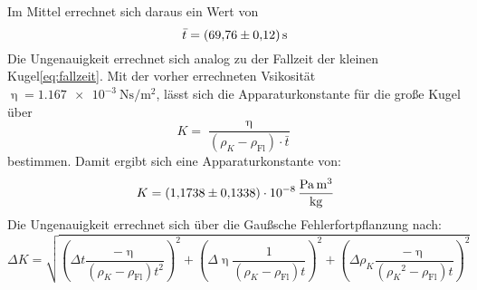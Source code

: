  Im Mittel errechnet sich daraus ein Wert von
 \begin{equation*}
   \bar{t} = \SI{69.76\pm0.12}{\second}
 \end{equation*}
 Die Ungenauigkeit errechnet sich analog zu der Fallzeit der kleinen Kugel\eqref{eq:fallzeit}.
 Mit der vorher errechneten Vsikosität $\upeta=\SI{1.167e-3}{\newton\second\per\meter\squared}$, lässt sich die Apparaturkonstante für die große Kugel über
 \begin{equation*}
   K =\frac{\upeta}{(\rho_K - \rho_\text{Fl})\cdot \bar{t}}
 \end{equation*}
 bestimmen.
 Damit ergibt sich eine Apparaturkonstante von:
 \begin{equation*}
   K=\SI{1.1738\pm 0.1338 e-8}{\pascal\cubic\meter\per\kilo\gram}
 \end{equation*}
 Die Ungenauigkeit errechnet sich über die Gaußsche Fehlerfortpflanzung nach:
 \begin{equation*}
   \Delta K = \sqrt{(\Delta t \frac{- \upeta}{(\rho_K - \rho_\text{Fl})t^2})^2 +(\Delta \upeta \frac{1}{(\rho_K - \rho_\text{Fl})t})^2 + (\Delta \rho_K \frac{-\upeta}{({\rho_K}^2 - \rho_\text{Fl})t})^2}
 \end{equation*}
%

